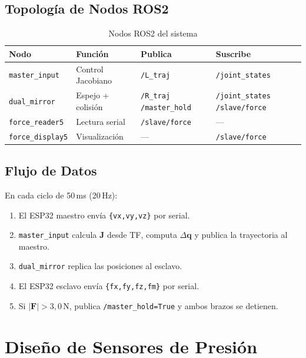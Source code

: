 \documentclass[journal,10pt,twoside]{IEEEtran}
\newcommand{\ros}{ROS2}
\begin{document}
\subsection{Topología de Nodos \ros{}}

\begin{table}[H]
  \centering\footnotesize\caption{Nodos \ros{} del sistema}
  \label{tab:nodes}
  \begin{tabular}{p{2.1cm}p{2.4cm}p{1.4cm}p{1.0cm}}
    \toprule
    \textbf{Nodo}&\textbf{Función}&\textbf{Publica}&\textbf{Suscribe}\\
    \midrule
    \rowcolor{tec_iceblue}
    \texttt{master\_input}&Control Jacobiano&\texttt{/L\_traj}&\texttt{/joint\_states}\\
    \texttt{dual\_mirror}&Espejo + colisión&\texttt{/R\_traj /master\_hold}&\texttt{/joint\_states /slave/force}\\
    \rowcolor{tec_iceblue}
    \texttt{force\_reader5}&Lectura serial&\texttt{/slave/force}&---\\
    \texttt{force\_display5}&Visualización&---&\texttt{/slave/force}\\
    \bottomrule
  \end{tabular}
\end{table}

\subsection{Flujo de Datos}

En cada ciclo de 50\,ms (20\,Hz):
\begin{enumerate}[leftmargin=1.4em,itemsep=1pt]
  \item El ESP32 maestro envía \texttt{\{vx,vy,vz\}} por serial.
  \item \texttt{master\_input} calcula $\bm{J}$ desde TF, computa
        $\Delta\bm{q}$ y publica la trayectoria al maestro.
  \item \texttt{dual\_mirror} replica las posiciones al esclavo.
  \item El ESP32 esclavo envía \texttt{\{fx,fy,fz,fm\}} por serial.
  \item Si $|\bm{F}|>3{,}0$\,N, publica
        \texttt{/master\_hold=True} y ambos brazos se detienen.
\end{enumerate}

\section{Diseño de Sensores de Presión}
\label{sec:sensors}
\end{document}
